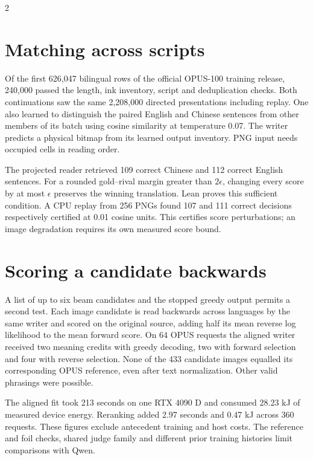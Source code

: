 \begin{multicols}{2}
\section*{Matching across scripts}
Of the first 626,047 bilingual rows of the official OPUS-100 training release, 240,000 passed the length, ink inventory, script and deduplication checks. Both continuations saw the same 2,208,000 directed presentations including replay. One also learned to distinguish the paired English and Chinese sentences from other members of its batch using cosine similarity at temperature 0.07. The writer predicts a physical bitmap from its learned output inventory. PNG input needs occupied cells in reading order.
\par The projected reader retrieved 109 correct Chinese and 112 correct English sentences. For a rounded gold--rival margin greater than $2\epsilon$, changing every score by at most $\epsilon$ preserves the winning translation. Lean proves this sufficient condition. A CPU replay from 256 PNGs found 107 and 111 correct decisions respectively certified at 0.01 cosine units. This certifies score perturbations; an image degradation requires its own measured score bound.
\section*{Scoring a candidate backwards}
A list of up to six beam candidates and the stopped greedy output permits a second test. Each image candidate is read backwards across languages by the same writer and scored on the original source, adding half its mean reverse log likelihood to the mean forward score. On 64 OPUS requests the aligned writer received two meaning credits with greedy decoding, two with forward selection and four with reverse selection. None of the 433 candidate images equalled its corresponding OPUS reference, even after text normalization. Other valid phrasings were possible.
\par The aligned fit took 213 seconds on one RTX 4090 D and consumed 28.23 kJ of measured device energy. Reranking added 2.97 seconds and 0.47 kJ across 360 requests. These figures exclude antecedent training and host costs. The reference and foil checks, shared judge family and different prior training histories limit comparisons with Qwen.
\end{multicols}
